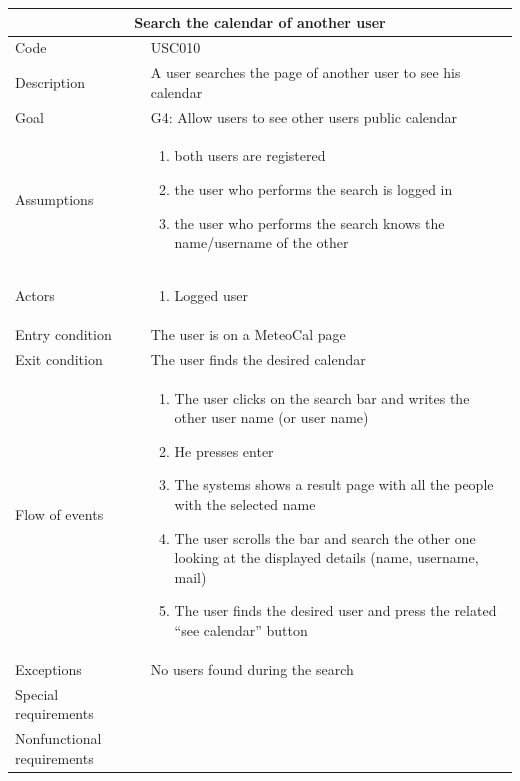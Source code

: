 \documentclass[10pt,a4paper,titlepage]{article}
\begin{document}
\begin{tabular}[h]{| p{3cm} | p{10cm} |}
\hline \multicolumn{2}{|c|}{\textbf{Search the calendar of another user}} \\ 
\hline Code & USC010\\ 
\hline Description & A user searches the page of another user to see his calendar \\
\hline Goal & G4: Allow users to see other users public calendar\\
\hline Assumptions  & \begin{enumerate}
\item both users are registered
\item the user who performs the search is logged in
\item the user who performs the search knows the name/username of the other
\end{enumerate} \\
\hline Actors &  \begin{enumerate}
\item Logged user
\end{enumerate} \\
\hline Entry condition & The user is on a MeteoCal page\\
\hline Exit condition & The user finds the desired calendar\\
\hline Flow of events & \begin{enumerate}
\item The user clicks on the search bar and writes the other user name (or user name)
\item He presses enter
\item The systems shows a result page with all the people with the selected name
\item The user scrolls the bar and search the other one looking at the displayed details (name, username, mail)
\item The user finds the desired user and press the related “see calendar” button
\end{enumerate}\\
\hline Exceptions & No users found during the search \\
\hline Special requirements & \\
\hline Nonfunctional requirements & \\
\hline
\end{tabular}
\end{document}
